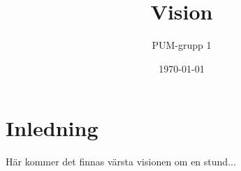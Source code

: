 

\ifpdf
\else
\fi

\title{Vision}
\author{PUM-grupp 1}
\date{\today}



\maketitle\thispagestyle{empty}

\section{Inledning}
Här kommer det finnas värsta visionen om en stund...


